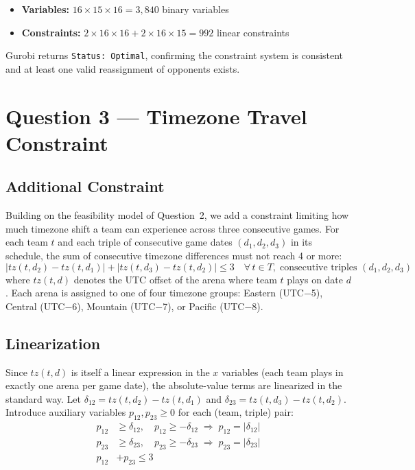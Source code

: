 \documentclass[11pt, letterpaper]{article}
\begin{document}
\begin{itemize}[nosep]
  \item \textbf{Variables:} $16 \times 15 \times 16 = 3{,}840$ binary variables
  \item \textbf{Constraints:} $2 \times 16 \times 16 + 2 \times 16 \times 15 = 992$ linear constraints
\end{itemize}

Gurobi returns \texttt{Status: Optimal}, confirming the constraint system is
consistent and at least one valid reassignment of opponents exists.

\section{Question 3 --- Timezone Travel Constraint}

\subsection{Additional Constraint}

Building on the feasibility model of Question~2, we add a constraint limiting
how much timezone shift a team can experience across three consecutive games.
For each team $t$ and each triple of consecutive game dates $(d_1, d_2, d_3)$
in its schedule, the sum of consecutive timezone differences must not reach 4 or
more:
\[
  |tz(t,d_2) - tz(t,d_1)| + |tz(t,d_3) - tz(t,d_2)| \leq 3
  \quad \forall\, t \in T,\; \text{consecutive triples } (d_1,d_2,d_3)
\]
where $tz(t,d)$ denotes the UTC offset of the arena where team $t$ plays on
date $d$. Each arena is assigned to one of four timezone groups: Eastern
(UTC$-$5), Central (UTC$-$6), Mountain (UTC$-$7), or Pacific (UTC$-$8).

\subsection{Linearization}

Since $tz(t,d)$ is itself a linear expression in the $x$ variables (each team
plays in exactly one arena per game date), the absolute-value terms are
linearized in the standard way. Let $\delta_{12} = tz(t,d_2) - tz(t,d_1)$ and
$\delta_{23} = tz(t,d_3) - tz(t,d_2)$. Introduce auxiliary variables
$p_{12}, p_{23} \geq 0$ for each (team, triple) pair:
\begin{align*}
  p_{12} &\geq \delta_{12}, \quad p_{12} \geq -\delta_{12} \;\Rightarrow\; p_{12} = |\delta_{12}| \\
  p_{23} &\geq \delta_{23}, \quad p_{23} \geq -\delta_{23} \;\Rightarrow\; p_{23} = |\delta_{23}| \\
  p_{12} &+ p_{23} \leq 3
\end{align*}
\end{document}
